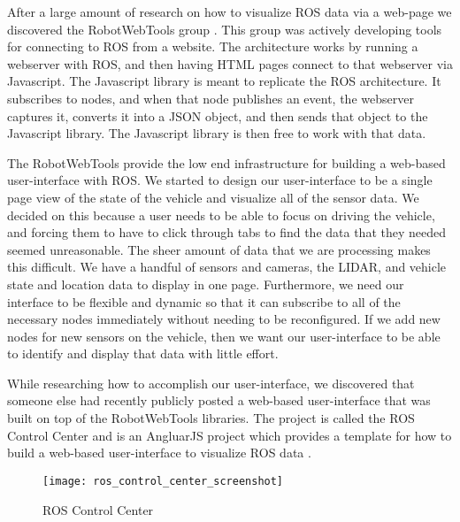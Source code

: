 After a large amount of research on how to visualize ROS data via a web-page we discovered the RobotWebTools group \cite{robotwebtools}. This group was actively developing tools for connecting to ROS from a website.  The architecture works by running a webserver with ROS, and then having HTML pages connect to that webserver via Javascript.  The Javascript library is meant to replicate the ROS architecture.  It subscribes to nodes, and when that node publishes an event, the webserver captures it, converts it into a JSON object, and then sends that object to the Javascript library.  The Javascript library is then free to work with that data.

The RobotWebTools provide the low end infrastructure for building a web-based user-interface with ROS.  We started to design our user-interface to be a single page view of the state of the vehicle and visualize all of the sensor data.  We decided on this because a user needs to be able to focus on driving the vehicle, and forcing them to have to click through tabs to find the data that they needed seemed unreasonable.  The sheer amount of data that we are processing makes this difficult.  We have a handful of sensors and cameras, the LIDAR, and vehicle state and location data to display in one page.  Furthermore, we need our interface to be flexible and dynamic so that it can subscribe to all of the necessary nodes immediately without needing to be reconfigured.  If we add new nodes for new sensors on the vehicle, then we want our user-interface to be able to identify and display that data with little effort.

While researching how to accomplish our user-interface, we discovered that someone else had recently publicly posted a web-based user-interface that was built on top of the RobotWebTools libraries.  The project is called the ROS Control Center and is an AngluarJS project which provides a template for how to build a web-based user-interface to visualize ROS data \cite{roscontrolcenter}.

\begin{figure}[H]
\centerline{\texttt{[image: ros\_control\_center\_screenshot]}}
\caption[]{ROS Control Center}
\label{fig:roscontrolcenter}
\end{figure}

